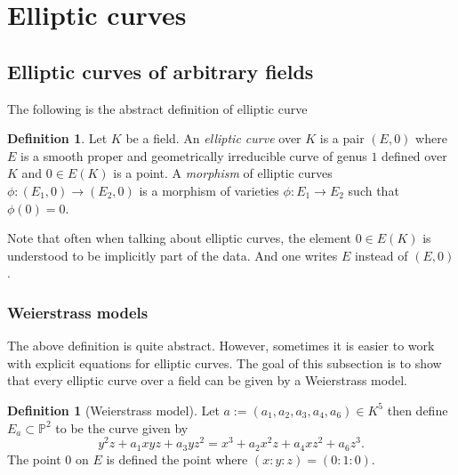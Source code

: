 \documentclass[a4paper,12pt,reqno]{amsart}
\newcommand{\field}[1]{\mathbb{#1}}  %
\renewcommand{\P}{\field{P}}
\theoremstyle{definition}
\newtheorem{definition}[lemma]{Definition}
\numberwithin{lemma}{section}
\numberwithin{equation}{section}
\numberwithin{figure}{section}
\begin{document}
\section{Elliptic curves}

\subsection{Elliptic curves of arbitrary fields}
The following is the abstract definition of elliptic curve
\begin{definition}\label{def:ec-over-K}
Let $K$ be a field. An \textit{elliptic curve} over $K$ is a pair $(E,0)$ where $E$ is a smooth proper and geometrically irreducible curve of genus $1$ defined over $K$ and $0 \in E(K)$ is a point. A \textit{morphism} of elliptic curves $\phi:  (E_1,0) \to (E_2,0)$ is a morphism of varieties $\phi: E_1 \to E_2$ such that $\phi(0)=0$.
\end{definition}

Note that often when talking about elliptic curves, the element $0 \in E(K)$ is understood to be implicitly part of the data. And one writes $E$ instead of $(E,0)$.

\subsubsection{Weierstrass models}\label{sec:weierstrass-over-K}
The above definition is quite abstract. However, sometimes it is easier to work with explicit equations for elliptic curves. The goal of this subsection is to show that every elliptic curve over a field can be given by a Weierstrass model.

\begin{definition}[Weierstrass model]\label{def:weierstrass-model-over-K}
Let $a := (a_1,a_2,a_3,a_4,a_6) \in K^5$ then define $E_{a} \subset \P^2$ to be the curve given by
$$y^2z+ a_1xyz+a_3yz^2=x^3+a_2x^2z+a_4xz^2+a_6z^3.$$
The point $0$ on $E$ is defined the point where $(x:y:z) = (0:1:0)$.
\end{definition}
\end{document}
